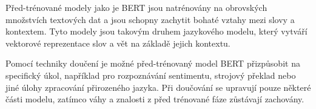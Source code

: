 Před-trénované modely jako je BERT jsou natrénovány na obrovských množstvích textových dat a jsou schopny zachytit bohaté vztahy mezi slovy a kontextem.
Tyto modely jsou takovým druhem jazykového modelu, který vytváří vektorové reprezentace slov a vět na základě jejich kontextu.

Pomocí techniky doučení je možné před-trénovaný model BERT přizpůsobit na specifický úkol, například pro rozpoznávání sentimentu, strojový překlad nebo jiné úlohy zpracování přirozeného jazyka.
Při doučování se upravují pouze některé části modelu, zatímco váhy a znalosti z před trénované fáze zůstávají zachovány.

\endinput
